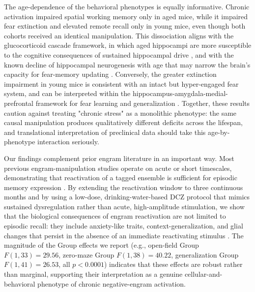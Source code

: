 \documentclass[11pt]{article}
\begin{document}
The age-dependence of the behavioral phenotypes is equally informative. Chronic activation impaired spatial working memory only in aged mice, while it impaired fear extinction and elevated remote recall only in young mice, even though both cohorts received an identical manipulation. This dissociation aligns with the glucocorticoid cascade framework, in which aged hippocampi are more susceptible to the cognitive consequences of sustained hippocampal drive \citep{sapolsky1986glucocorticoid}, and with the known decline of hippocampal neurogenesis with age that may narrow the brain's capacity for fear-memory updating \citep{klempin2007neurogenesis}. Conversely, the greater extinction impairment in young mice is consistent with an intact but hyper-engaged fear system, and can be interpreted within the hippocampus-amygdala-medial-prefrontal framework for fear learning and generalization \citep{maren2013contextual,tovote2015circuits}. Together, these results caution against treating "chronic stress" as a monolithic phenotype: the same causal manipulation produces qualitatively different deficits across the lifespan, and translational interpretation of preclinical data should take this age-by-phenotype interaction seriously.

Our findings complement prior engram literature in an important way. Most previous engram-manipulation studies operate on acute or short timescales, demonstrating that reactivation of a tagged ensemble is sufficient for episodic memory expression \citep{liu2012engram,redondo2014valence,ramirez2015positive,josselyn2020engram}. By extending the reactivation window to three continuous months and by using a low-dose, drinking-water-based DCZ protocol that mimics sustained dysregulation rather than acute, high-amplitude stimulation, we show that the biological consequences of engram reactivation are not limited to episodic recall: they include anxiety-like traits, context-generalization, and glial changes that persist in the absence of an immediate reactivating stimulus \citep{nagai2020dcz,roth2016dreadds,denardo2019temporal}. The magnitude of the Group effects we report (e.g., open-field Group $F(1,33)=29.56$, zero-maze Group $F(1,38)=40.22$, generalization Group $F(1,41)=26.53$, all $p<0.0001$) indicates that these effects are robust rather than marginal, supporting their interpretation as a genuine cellular-and-behavioral phenotype of chronic negative-engram activation.
\end{document}
